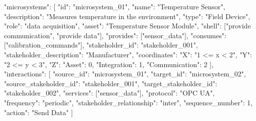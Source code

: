{
  "microsystems": [
    {
      "id": "microsystem_01",
      "name": "Temperature Sensor",
      "description": "Measures temperature in the environment",
      "type": "Field Device",
      "role": "data acquisition",
      "asset": "Temperature Sensor Module",
      "shell": ["provide communication", "provide data"],
      "provides": ["sensor_data"],
      "consumes": ["calibration_commands"],
      "stakeholder_id": "stakeholder_001",
      "stakeholder_description": "Manufacturer",
      "coordinates": {
        "X": "1 <= x < 2",
        "Y": "2 <= y < 3",
        "Z": {
          "Asset": 0,
          "Integration": 1,
          "Communication": 2
        }
      }
    }
  ],
  "interactions": [
    {
      "source_id": "microsystem_01",
      "target_id": "microsystem_02",
      "source_stakeholder_id": "stakeholder_001",
      "target_stakeholder_id": "stakeholder_002",
      "services": ["sensor_data"],
      "protocol": "OPC UA",
      "frequency": "periodic",
      "stakeholder_relationship": "inter",
      "sequence_number": 1,
      "action": "Send Data"
    }
  ]
}